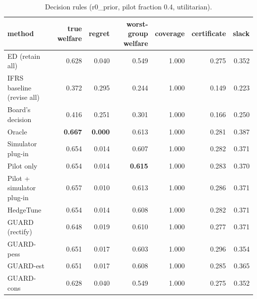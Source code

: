 \begin{table}[t]
\centering
\small
\begin{tabular}{lrrrrrr}
\toprule
method & true welfare & regret & worst-group welfare & coverage & certificate & slack \\
\midrule
ED (retain all) & 0.628 & 0.040 & 0.549 & 1.000 & 0.275 & 0.352 \\
IFRS baseline (revise all) & 0.372 & 0.295 & 0.244 & 1.000 & 0.149 & 0.223 \\
Board's decision & 0.416 & 0.251 & 0.301 & 1.000 & 0.166 & 0.250 \\
Oracle & \textbf{0.667} & \textbf{0.000} & 0.613 & 1.000 & 0.281 & 0.387 \\
Simulator plug-in & 0.654 & 0.014 & 0.607 & 1.000 & 0.282 & 0.371 \\
Pilot only & 0.654 & 0.014 & \textbf{0.615} & 1.000 & 0.283 & 0.370 \\
Pilot + simulator plug-in & 0.657 & 0.010 & 0.613 & 1.000 & 0.286 & 0.371 \\
HedgeTune & 0.654 & 0.014 & 0.608 & 1.000 & 0.282 & 0.371 \\
GUARD (rectify) & 0.648 & 0.019 & 0.610 & 1.000 & 0.277 & 0.371 \\
GUARD-pess & 0.651 & 0.017 & 0.603 & 1.000 & 0.296 & 0.354 \\
GUARD-est & 0.651 & 0.017 & 0.608 & 1.000 & 0.285 & 0.365 \\
GUARD-cons & 0.628 & 0.040 & 0.549 & 1.000 & 0.275 & 0.352 \\
\bottomrule
\end{tabular}
\caption{Decision rules (r0\_prior, pilot fraction 0.4, utilitarian).}
\label{tab:methods-utilitarian}
\end{table}
